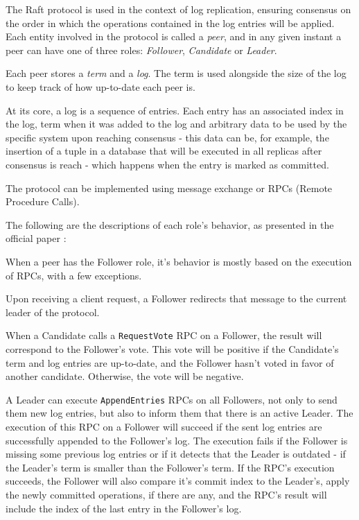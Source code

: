 The Raft protocol \cite{raft} is used in the context of log replication, ensuring consensus on the order in which the operations contained in the log entries will be applied. Each entity involved in the protocol is called a \textit{peer}, and in any given instant a peer can have one of three roles: \textit{Follower}, \textit{Candidate} or \textit{Leader}.

Each peer stores a \textit{term} and a \textit{log}. The term is used alongside the size of the log to keep track of how up-to-date each peer is.

At its core, a log is a sequence of entries. Each entry has an associated index in the log, term when it was added to the log and arbitrary data to be used by the specific system upon reaching consensus - this data can be, for example, the insertion of a tuple in a database that will be executed in all replicas after consensus is reach - which happens when the entry is marked as committed.


The protocol can be implemented using message exchange or RPCs (Remote Procedure Calls). 

The following are the descriptions of each role’s behavior, as presented in the official paper \cite{raft}:

When a peer has the Follower role, it’s behavior is mostly based on the execution of RPCs, with a few exceptions.

Upon receiving a client request, a Follower redirects that message to the current leader of the protocol.

When a Candidate calls a \texttt{RequestVote} RPC on a Follower, the result will correspond to the Follower’s vote. This vote will be positive if the Candidate’s term and log entries are up-to-date, and the Follower hasn’t voted in favor of another candidate. Otherwise, the vote will be negative.

A Leader can execute \texttt{AppendEntries} RPCs on all Followers, not only to send them new log entries, but also to inform them that there is an active Leader. The execution of this RPC on a Follower will succeed if the sent log entries are successfully appended to the Follower’s log. The execution fails if the Follower is missing some previous log entries or if it detects that the Leader is outdated - if the Leader’s term is smaller than the Follower’s term. If the RPC’s execution succeeds, the Follower will also compare it’s commit index to the Leader’s, apply the newly committed operations, if there are any, and the RPC’s result will include the index of the last entry in the Follower’s log.


